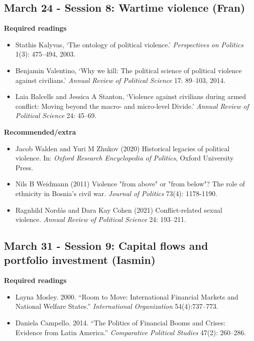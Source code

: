 \documentclass[12pt, a4paper]{article}
\begin{document}
\subsection*{March 24 - Session 8: Wartime violence (Fran)}

\noindent \textbf{Required readings}

\begin{itemize}
  \item Stathis Kalyvas, `The ontology of political violence.' \textit{Perspectives on Politics} 1(3): 475--494, 2003.
  \item Benjamin Valentino, `Why we kill: The political science of political violence against civilians.' \textit{Annual Review of Political Science} 17: 89--103, 2014.
  \item Laia Balcells and Jessica A Stanton, `Violence against civilians during armed conflict: Moving beyond the macro- and micro-level Divide.' \textit{Annual Review of Political Science} 24: 45--69.
\end{itemize}

\noindent \textbf{Recommended/extra}

\begin{itemize}
  \item Jacob Walden and Yuri M Zhukov (2020) Historical legacies of political violence. In: \textit{Oxford Research Encyclopedia of Politics}, Oxford University Press.
  \item Nils B Weidmann (2011) Violence "from above" or "from below"? The role of ethnicity in Bosnia's civil war. \textit{Journal of Politics} 73(4): 1178-1190.
  \item Ragnhild Nordås and Dara Kay Cohen (2021) Conflict-related sexual violence. \textit{Annual Review of Political Science} 24: 193--211.
\end{itemize}

\subsection*{March 31 - Session 9: Capital flows and portfolio investment (Iasmin)}

\noindent \textbf{Required readings}

\begin{itemize}
\item Layna Mosley. 2000. ``Room to Move: International Financial Markets and National Welfare States.'' \emph{International Organization} 54(4):737--773.
\item Daniela Campello. 2014. ``The Politics of Financial Booms and Crises: Evidence from Latin America.'' \emph{Comparative Political Studies} 47(2): 260--286.
\end{itemize}
\end{document}
